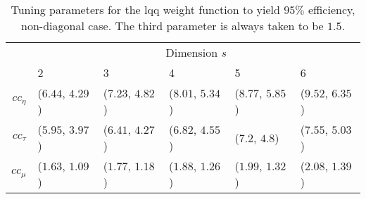\begin{table}[htbp!]
\begin{center}
{\small
\begin{tabular}{rlllll}
  \hline
  & \multicolumn{5}{c}{Dimension $s$} \\
  \cline{2-6}
   & 2 & 3 & 4 & 5 & 6 \\
   \hline
$cc_\eta$ & ($6.44$, $4.29$) & ($7.23$, $4.82$) & ($8.01$, $5.34$) & ($8.77$, $5.85$) & ($9.52$, $6.35$) \\
  $cc_\tau$ & ($5.95$, $3.97$) & ($6.41$, $4.27$) & ($6.82$, $4.55$) & ($7.2$, $4.8$) & ($7.55$, $5.03$) \\
  $cc_\mu$ & ($1.63$, $1.09$) & ($1.77$, $1.18$) & ($1.88$, $1.26$) & ($1.99$, $1.32$) & ($2.08$, $1.39$) \\
   \hline
\end{tabular}
}
\caption{Tuning parameters for the lqq weight function to yield $95\%$
  efficiency, non-diagonal case. The third parameter is always taken to be $1.5$.}
\label{tab:effLqq}
\end{center}
\end{table}
